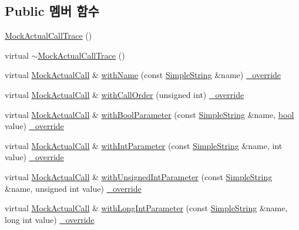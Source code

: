 \subsection*{Public 멤버 함수}
\begin{DoxyCompactItemize}
\item 
\hyperlink{class_mock_actual_call_trace_a48e7ec53e74480f650472323fb63edf5}{Mock\+Actual\+Call\+Trace} ()
\item 
virtual \hyperlink{class_mock_actual_call_trace_a012c112fb563a2c243a6ffbad0ad08db}{$\sim$\+Mock\+Actual\+Call\+Trace} ()
\item 
virtual \hyperlink{class_mock_actual_call}{Mock\+Actual\+Call} \& \hyperlink{class_mock_actual_call_trace_ae7c89b622276a3b97f7fa58deeaf110b}{with\+Name} (const \hyperlink{class_simple_string}{Simple\+String} \&name) \hyperlink{_cpp_u_test_config_8h_a049bea15dd750e15869863c94c1efc3b}{\+\_\+override}
\item 
virtual \hyperlink{class_mock_actual_call}{Mock\+Actual\+Call} \& \hyperlink{class_mock_actual_call_trace_aa025e9eb6893865e7f1df772334bf3fc}{with\+Call\+Order} (unsigned int) \hyperlink{_cpp_u_test_config_8h_a049bea15dd750e15869863c94c1efc3b}{\+\_\+override}
\item 
virtual \hyperlink{class_mock_actual_call}{Mock\+Actual\+Call} \& \hyperlink{class_mock_actual_call_trace_a1680f50f85a0607d6e348a0b9d54dccd}{with\+Bool\+Parameter} (const \hyperlink{class_simple_string}{Simple\+String} \&name, \hyperlink{avb__gptp_8h_af6a258d8f3ee5206d682d799316314b1}{bool} value) \hyperlink{_cpp_u_test_config_8h_a049bea15dd750e15869863c94c1efc3b}{\+\_\+override}
\item 
virtual \hyperlink{class_mock_actual_call}{Mock\+Actual\+Call} \& \hyperlink{class_mock_actual_call_trace_a0e256e5e14826fbba3dff8dffd0796ef}{with\+Int\+Parameter} (const \hyperlink{class_simple_string}{Simple\+String} \&name, int value) \hyperlink{_cpp_u_test_config_8h_a049bea15dd750e15869863c94c1efc3b}{\+\_\+override}
\item 
virtual \hyperlink{class_mock_actual_call}{Mock\+Actual\+Call} \& \hyperlink{class_mock_actual_call_trace_a2da305b889ee810e2f7bb4c709f4c29c}{with\+Unsigned\+Int\+Parameter} (const \hyperlink{class_simple_string}{Simple\+String} \&name, unsigned int value) \hyperlink{_cpp_u_test_config_8h_a049bea15dd750e15869863c94c1efc3b}{\+\_\+override}
\item 
virtual \hyperlink{class_mock_actual_call}{Mock\+Actual\+Call} \& \hyperlink{class_mock_actual_call_trace_ac7e0b15690e2805d19d6228e5760fb48}{with\+Long\+Int\+Parameter} (const \hyperlink{class_simple_string}{Simple\+String} \&name, long int value) \hyperlink{_cpp_u_test_config_8h_a049bea15dd750e15869863c94c1efc3b}{\+\_\+override}

\end{DoxyCompactItemize}
